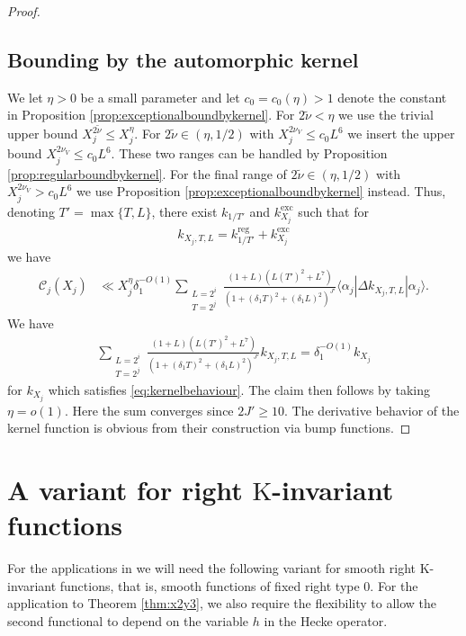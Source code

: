 \documentclass[12pt]{amsart}
\theoremstyle{definition}
\theoremstyle{remark}
\numberwithin{equation}{section}
\newcommand{\1}{{\mathbf 1}}
\begin{document}
\begin{proof}
\subsection{Bounding by the automorphic kernel}
We let $\eta > 0$ be a small parameter and let $c_0= c_0(\eta)> 1$ denote the constant in Proposition \ref{prop:exceptionalboundbykernel}. For $2\widetilde{\nu} < \eta$ we use the trivial upper bound $X_j^{2\widetilde{\nu}} \leq X_j^{\eta}$. For $2\widetilde{\nu} \in (\eta,1/2)$ with $X_j^{2\nu_V} \leq c_0 L^6$ we insert the upper bound $X_j^{2\nu_V}  \leq c_0 L^6$. These two ranges can be handled by Proposition \ref{prop:regularboundbykernel}. For the final range of $2\widetilde{\nu} \in (\eta,1/2)$ with $X_j^{2\nu_V} > c_0 L^6$ we use Proposition \ref{prop:exceptionalboundbykernel} instead. Thus, denoting $T'=\max\{T,L\}$, there exist $k_{1/T'}$ and $k^{\mathrm{exc}}_{X_j}$ such that for 
\begin{align*}
    k_{X_j,T,L} = k^{\mathrm{reg}}_{1/T'}+k^{\mathrm{exc}}_{X_j} 
\end{align*}
we have
\begin{align*}
     \mathcal{C}_j(X_j) &\ll  X_j^{\eta}\delta_1^{-O(1)}  \sum_{\substack{L=2^i \\ T=2^j }} \frac{(1+L)(L (T')^2+L^7)}{(1+(\delta_1 T)^2+(\delta_1 L)^2)^{J'} }  \langle \alpha_j |\Delta k_{X_j,T,L} | \alpha_j \rangle.
\end{align*}
We have
\begin{align*}
 \sum_{\substack{L=2^i \\ T=2^j }} \frac{(1+L)(L (T')^2+L^7)}{(1+(\delta_1 T)^2+(\delta_1 L)^2)^{J'} }  k_{X_j,T,L} = \delta_1^{-O(1)} k_{X_j}
\end{align*}
for $k_{X_j}$ which satisfies \eqref{eq:kernelbehaviour}. The claim then follows by taking $\eta = o(1)$. Here the sum converges since $2J' \geq 10$.
The derivative behavior of the kernel function is obvious from their construction via bump functions.

\end{proof}

\section{A variant for right $\mathrm{K}$-invariant functions}
For the applications in \cite{GMquadratic} we will need the following variant for smooth right $\mathrm{K}$-invariant functions, that is, smooth functions of fixed right type $0$. For the application to Theorem \ref{thm:x2y3}, we also require the flexibility to allow the second functional to depend on the variable $h$ in the Hecke operator.
\end{document}
